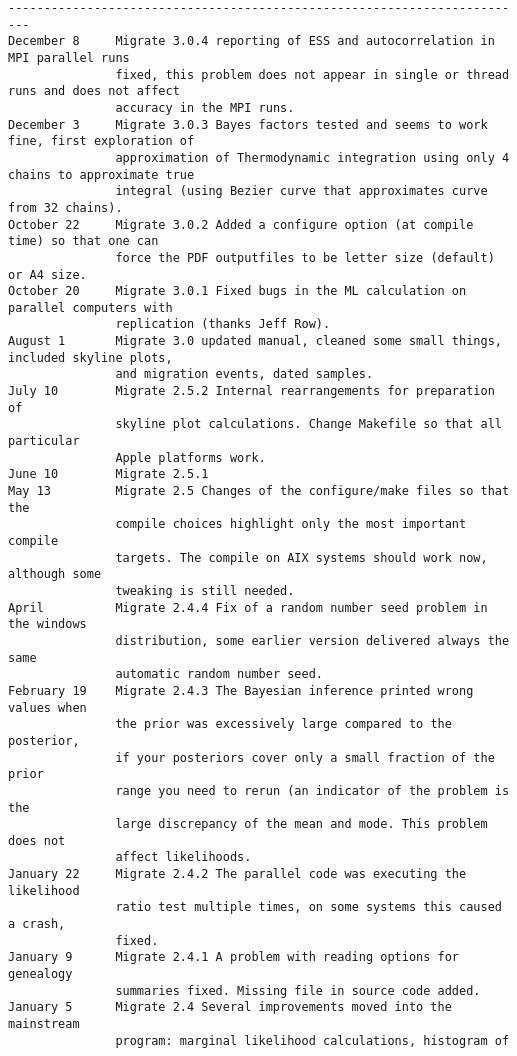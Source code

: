 \begin{small}
\begin{verbatim}
-------------------------------------------------------------------------
December 8     Migrate 3.0.4 reporting of ESS and autocorrelation in MPI parallel runs
               fixed, this problem does not appear in single or thread runs and does not affect 
               accuracy in the MPI runs.
December 3     Migrate 3.0.3 Bayes factors tested and seems to work fine, first exploration of 
               approximation of Thermodynamic integration using only 4 chains to approximate true
               integral (using Bezier curve that approximates curve from 32 chains).
October 22     Migrate 3.0.2 Added a configure option (at compile time) so that one can
               force the PDF outputfiles to be letter size (default) or A4 size.
October 20     Migrate 3.0.1 Fixed bugs in the ML calculation on parallel computers with 
               replication (thanks Jeff Row).  
August 1       Migrate 3.0 updated manual, cleaned some small things, included skyline plots,
               and migration events, dated samples. 
July 10        Migrate 2.5.2 Internal rearrangements for preparation of 
               skyline plot calculations. Change Makefile so that all particular
               Apple platforms work.
June 10        Migrate 2.5.1 
May 13         Migrate 2.5 Changes of the configure/make files so that the
               compile choices highlight only the most important compile 
               targets. The compile on AIX systems should work now, although some
               tweaking is still needed.
April          Migrate 2.4.4 Fix of a random number seed problem in the windows
               distribution, some earlier version delivered always the same 
               automatic random number seed.
February 19    Migrate 2.4.3 The Bayesian inference printed wrong values when
               the prior was excessively large compared to the posterior,
               if your posteriors cover only a small fraction of the prior
               range you need to rerun (an indicator of the problem is the
               large discrepancy of the mean and mode. This problem does not 
               affect likelihoods.
January 22     Migrate 2.4.2 The parallel code was executing the likelihood 
               ratio test multiple times, on some systems this caused a crash,
               fixed.
January 9      Migrate 2.4.1 A problem with reading options for genealogy
               summaries fixed. Missing file in source code added.
January 5      Migrate 2.4 Several improvements moved into the mainstream
               program: marginal likelihood calculations, histogram of 

\end{verbatim}
\end{small}
